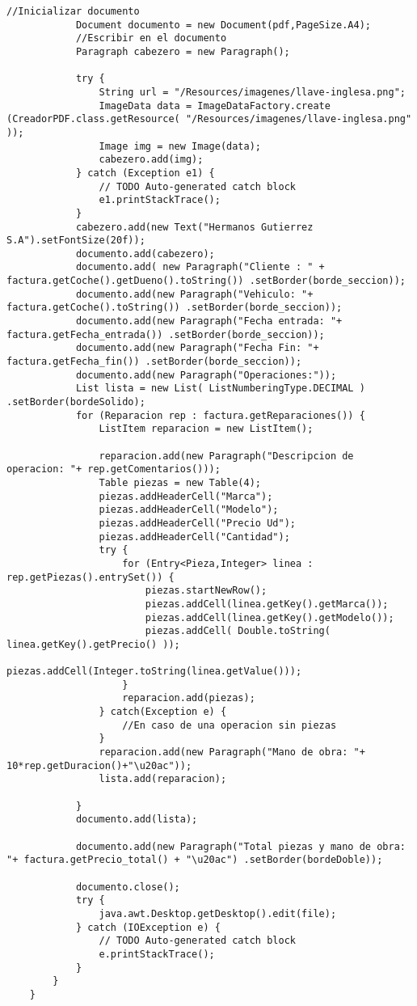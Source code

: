 \begin{lstlisting}[caption=CreadorPDF.java (App Escritorio)]
            //Inicializar documento
            Document documento = new Document(pdf,PageSize.A4);
            //Escribir en el documento
            Paragraph cabezero = new Paragraph();
    
            try {
                String url = "/Resources/imagenes/llave-inglesa.png";
                ImageData data = ImageDataFactory.create (CreadorPDF.class.getResource( "/Resources/imagenes/llave-inglesa.png" ));
                Image img = new Image(data);
                cabezero.add(img);
            } catch (Exception e1) {
                // TODO Auto-generated catch block
                e1.printStackTrace();
            }
            cabezero.add(new Text("Hermanos Gutierrez S.A").setFontSize(20f));
            documento.add(cabezero);
            documento.add( new Paragraph("Cliente : " + factura.getCoche().getDueno().toString()) .setBorder(borde_seccion));
            documento.add(new Paragraph("Vehiculo: "+ factura.getCoche().toString()) .setBorder(borde_seccion));
            documento.add(new Paragraph("Fecha entrada: "+ factura.getFecha_entrada()) .setBorder(borde_seccion));
            documento.add(new Paragraph("Fecha Fin: "+ factura.getFecha_fin()) .setBorder(borde_seccion));
            documento.add(new Paragraph("Operaciones:"));
            List lista = new List( ListNumberingType.DECIMAL ) .setBorder(bordeSolido);
            for (Reparacion rep : factura.getReparaciones()) {
                ListItem reparacion = new ListItem();
                
                reparacion.add(new Paragraph("Descripcion de operacion: "+ rep.getComentarios()));
                Table piezas = new Table(4);
                piezas.addHeaderCell("Marca");
                piezas.addHeaderCell("Modelo");
                piezas.addHeaderCell("Precio Ud");
                piezas.addHeaderCell("Cantidad");
                try {
                    for (Entry<Pieza,Integer> linea : rep.getPiezas().entrySet()) {
                        piezas.startNewRow();
                        piezas.addCell(linea.getKey().getMarca());
                        piezas.addCell(linea.getKey().getModelo());
                        piezas.addCell( Double.toString( linea.getKey().getPrecio() ));
                        piezas.addCell(Integer.toString(linea.getValue()));
                    }
                    reparacion.add(piezas);
                } catch(Exception e) {
                    //En caso de una operacion sin piezas
                }
                reparacion.add(new Paragraph("Mano de obra: "+ 10*rep.getDuracion()+"\u20ac"));
                lista.add(reparacion);
    
            } 
            documento.add(lista);
            
            documento.add(new Paragraph("Total piezas y mano de obra: "+ factura.getPrecio_total() + "\u20ac") .setBorder(bordeDoble));
            
            documento.close();
            try {
                java.awt.Desktop.getDesktop().edit(file);
            } catch (IOException e) {
                // TODO Auto-generated catch block
                e.printStackTrace();
            }
        }
    }
\end{lstlisting}
\clearpage